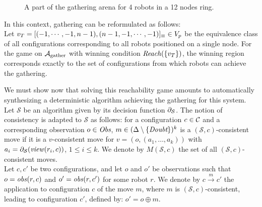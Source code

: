 \begin{figure}
\caption{A part of the gathering arena for 4 robots in a 12 nodes ring.} 
\label{fig:Agather}
\end{figure}


\bigskip

In this context, gathering can be reformulated as follows: \\
Let $v_T=[(-1, \cdots, -1, n-1), (n-1, -1, \cdots, -1)]_{\equiv}\in V_p$ 
be the equivalence class 
of all configurations corresponding to all robots positioned on a single node.
For the game on $\mathcal{A}_{\textrm{gather}}$ with winning condition $\mathit{Reach}(\{v_T\})$, the winning region corresponds
 exactly to the set of configurations from which robots can achieve the gathering. 
 
We must show now that solving this reachability game 
amounts to automatically synthesizing a deterministic algorithm achieving the gathering for this system.
Let $\mathcal{S}$ be an algorithm given by its decision function $\partial_\mathcal{S}$.
The notion of consistency is adapted to $\mathcal{S}$ as follows:  
for a configuration $c\in\mathcal{C}$ and a corresponding observation $o\in \textit{Obs}$, 
$m \in (\Delta \setminus \{\textit{Doubt}\})^k$ is a $(\mathcal{S}, c)$-consistent move 
if it is a $v$-consistent move for $v=(o, (a_1, \dots, a_k))$ with 
$a_i=\partial_\mathcal{S}(\mathit{view}(r_i, c))$, $1\leq i \leq k$. We denote by $M(\mathcal{S}, c)$ the set of all $(\mathcal{S}, c)$-consistent moves.\\
 Let $c, c'$ be two configurations, and let $o$ and $o'$ be observations such that $o = \mathit{obs}(r, c)$ and $o'=\mathit{obs}(r, c')$
 for some robot $r$. We denote by $c\xrightarrow{m} c'$ 
 the application to configuration $c$ of the move $m$, where $m$ is $(\mathcal{S}, c)$-consistent,  
 leading to configuration $c'$, defined by:  $o' = o \oplus m$.
 
